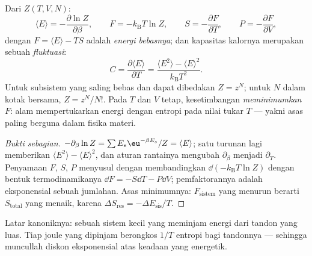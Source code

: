 \begin{proposition}[Mesinnya]\label{prop:b3:canonical-ensemble:machine}
Dari $Z(T, V, N)$:
\[
\langle E\rangle = -\frac{\partial\ln Z}{\partial\beta} , \qquad
F = -k_{\text{B}}T\ln Z , \qquad
S = -\frac{\partial F}{\partial T} , \qquad
P = -\frac{\partial F}{\partial V} ,
\]
dengan $F = \langle E\rangle - TS$ adalah \emph{energi bebasnya}; dan
kapasitas kalornya merupakan sebuah \emph{fluktuasi}:
\[
C = \frac{\partial\langle E\rangle}{\partial T}
 = \frac{\langle E^2\rangle - \langle E\rangle^2}
{k_{\text{B}}T^2} .
\]
Untuk subsistem yang saling bebas dan dapat dibedakan $Z = z^N$; untuk
$N$  dalam kotak bersama, $Z = z^N/N!$. Pada $T$ dan $V$
tetap, kesetimbangan \emph{meminimumkan} $F$: alam mempertukarkan energi
dengan entropi pada nilai tukar $T$ --- yakni asas paling berguna dalam
fisika materi.
\end{proposition}

\begin{proof}[Bukti sebagian]
$-\partial_\beta\ln Z = \sum E_s\eu^{-\beta E_s}/Z = \langle
E\rangle$; satu turunan lagi memberikan $\langle E^2\rangle - \langle
E\rangle^2$, dan aturan rantainya mengubah $\partial_\beta$ menjadi
$\partial_T$. Penyamaan $F$, $S$, $P$ menyusul dengan membandingkan
$\dd(-k_{\text{B}}T\ln Z)$ dengan bentuk termodinamikanya
$\dd F = -S\dd T - P\dd V$; pemfaktorannya adalah eksponensial sebuah
jumlahan. Asas minimumnya: $F_{\text{sistem}}$ yang menurun berarti
$S_{\text{total}}$ yang menaik, karena $\Delta S_{\text{res}} =
-\Delta E_{\text{sis}}/T$.
\end{proof}

\begin{omfigure}

{\small Latar kanoniknya: sebuah sistem kecil yang meminjam energi dari
tandon yang luas. Tiap joule yang dipinjam berongkos $1/T$ entropi bagi
tandonnya --- sehingga muncullah diskon eksponensial atas keadaan yang
energetik.}
\end{omfigure}

